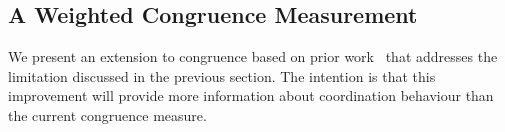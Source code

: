 







\subsection{A Weighted Congruence Measurement}
\label{sec:measure}

We present an extension to congruence based on prior work~\cite{kwan2009:weighted} that addresses the
limitation discussed in the previous section. The intention is that this improvement will
provide more information about coordination behaviour than the current congruence measure. 

